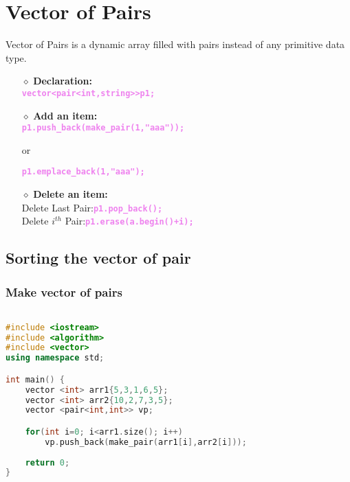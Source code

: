 \newpage
\section{\textbf{Vector of Pairs}}
Vector of Pairs is a dynamic array filled with pairs instead of any primitive data type.

\begin{itemize}
	
	\item[{\LARGE $\diamond$}]	\textbf{Declaration:}\\
		\tab\tab \textbf{\textcolor{violet}{\texttt{vector<pair<int,string>>p1;}}}
		
	\item[{\LARGE $\diamond$}]	\textbf{Add an item:}\\
		\tab\tab \textbf{\textcolor{violet}{\texttt{p1.push\_back(make\_pair(1,"aaa"));}}}
		\begin{center}
			or
		\end{center}
		\tab\tab \textbf{\textcolor{violet}{\texttt{p1.emplace\_back(1,"aaa");}}}
		
	\item[{\LARGE $\diamond$}]	\textbf{Delete an item:}\\
		\tab Delete Last Pair:\tab \textbf{\textcolor{violet}{\texttt{p1.pop\_back();}}}\\
		\tab Delete $i^{th}$ Pair:\tab \textbf{\textcolor{violet}{\texttt{p1.erase(a.begin()+i);}}}
	
\end{itemize}

\subsection{Sorting the vector of pair}
\subsubsection{Make vector of pairs}

\begin{lstlisting}[language=c++]

#include <iostream>
#include <algorithm>
#include <vector>
using namespace std;

int main() {
    vector <int> arr1{5,3,1,6,5};
    vector <int> arr2{10,2,7,3,5};
    vector <pair<int,int>> vp;

    for(int i=0; i<arr1.size(); i++)
        vp.push_back(make_pair(arr1[i],arr2[i]));
    
    return 0;
}

\end{lstlisting}

